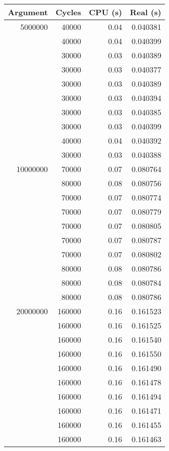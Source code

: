 \begin{tabular}{rrrr}
\toprule
 Argument & Cycles & CPU (s) & Real (s) \\
\midrule
 5000000 &   40000 &  0.04 &  0.040381 \\
         &   40000 &  0.04 &  0.040399 \\
         &   30000 &  0.03 &  0.040389 \\
         &   30000 &  0.03 &  0.040377 \\
         &   30000 &  0.03 &  0.040389 \\
         &   30000 &  0.03 &  0.040394 \\
         &   30000 &  0.03 &  0.040385 \\
         &   30000 &  0.03 &  0.040399 \\
         &   40000 &  0.04 &  0.040392 \\
         &   30000 &  0.03 &  0.040388 \\
\midrule
 10000000 &   70000 &  0.07 &  0.080764 \\
          &   80000 &  0.08 &  0.080756 \\
          &   70000 &  0.07 &  0.080774 \\
          &   70000 &  0.07 &  0.080779 \\
          &   70000 &  0.07 &  0.080805 \\
          &   70000 &  0.07 &  0.080787 \\
          &   70000 &  0.07 &  0.080802 \\
          &   80000 &  0.08 &  0.080786 \\
          &   80000 &  0.08 &  0.080784 \\
          &   80000 &  0.08 &  0.080786 \\
\midrule
 20000000 &  160000 &  0.16 &  0.161523 \\
          &  160000 &  0.16 &  0.161525 \\
          &  160000 &  0.16 &  0.161540 \\
          &  160000 &  0.16 &  0.161550 \\
          &  160000 &  0.16 &  0.161490 \\
          &  160000 &  0.16 &  0.161478 \\
          &  160000 &  0.16 &  0.161494 \\
          &  160000 &  0.16 &  0.161471 \\
          &  160000 &  0.16 &  0.161455 \\
          &  160000 &  0.16 &  0.161463 \\
\bottomrule
\end{tabular}
